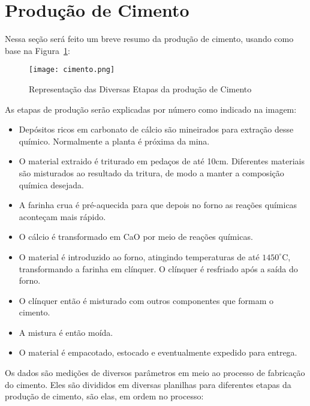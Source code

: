 \section{Produção de Cimento}
\label{sec:producao}

Nessa seção será feito um breve resumo da produção de cimento, usando como base na Figura~\ref{fig:cement}: \\ 

\begin{figure}[H]
\label{fig:cement}
\centering
\texttt{[image: cimento.png]}
\caption{Representação das Diversas Etapas da produção de Cimento \citep{cementroadmap}}
\end{figure}


As etapas de produção serão explicadas por número como indicado na imagem: \\

\begin{itemize}

\item[1] Depósitos ricos em carbonato de cálcio são mineirados para extração desse químico. Normalmente a planta é próxima da mina.
\item[2] O material extraido é triturado em pedaços de até 10cm. Diferentes materiais são misturados ao resultado da tritura, de modo a manter a composição química desejada. 
\item[3] A farinha crua é pré-aquecida para que depois no forno as reações químicas aconteçam mais rápido. 
\item[4] O cálcio é transformado em CaO por meio de reações químicas.  
\item[5] O material é introduzido ao forno, atingindo temperaturas de até $1450^\circ$C, transformando a farinha em clínquer. O clínquer é resfriado após a saída do forno. 
\item[6] O clínquer então é misturado com outros componentes que formam o cimento.
\item[7] A mistura é então moída.
\item[8] O material é empacotado, estocado e eventualmente expedido para entrega.

\end{itemize}

Os dados são medições de diversos parâmetros em meio ao processo de fabricação do cimento. Eles são divididos em diversas planilhas para diferentes etapas da produção de cimento, são elas, em ordem no processo:

